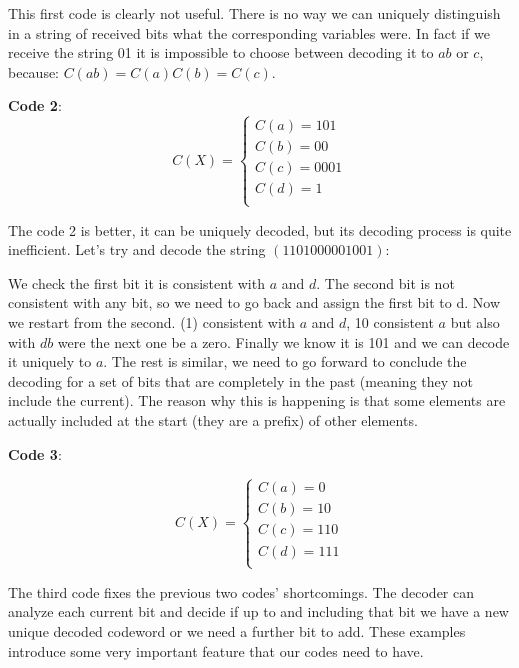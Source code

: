 This first code is clearly not useful. There is no way we can uniquely distinguish in a string of received bits what the corresponding variables were. In fact if we receive the string 01 it is impossible to choose between decoding it to $ab$ or $c$, because: $C(ab) = C(a)C(b) = C(c)$. \newline

\textbf{Code 2}: 
\begin{equation}
C(X) = \begin{cases}
C(a) = 101 \\
C(b) = 00 \\
C(c) = 0001 \\
C(d) = 1 \\
\end{cases}
\end{equation}


The code 2 is better, it can be uniquely decoded, but its decoding process is quite inefficient. Let's try and decode the string $(1101000001001)$:

We check the first bit it is consistent with $a$ and $d$. The second bit is not consistent with any bit, so we need to go back and assign the first bit to d. Now we restart from the second. (1) consistent with $a$ and $d$, 10 consistent $a$ but also with $db$ were the next one be a zero. Finally we know it is 101 and we can decode it uniquely to $a$. The rest is similar, we need to go forward to conclude the decoding for a set of bits that are completely in the past (meaning they not include the current). 
The reason why this is happening is that some elements are actually included at the start (they are a prefix) of other elements. \newline

\textbf{Code 3}:

\begin{equation}
C(X) = \begin{cases}
C(a) = 0 \\
C(b) = 10 \\
C(c) = 110 \\
C(d) = 111 \\
\end{cases}
\end{equation} 

The third code fixes the previous two codes' shortcomings. The decoder can analyze each current bit and decide if up to and including that bit we have a new unique decoded codeword or we need a further bit to add. \newline 
These examples introduce some very important feature that our codes need to have. 

